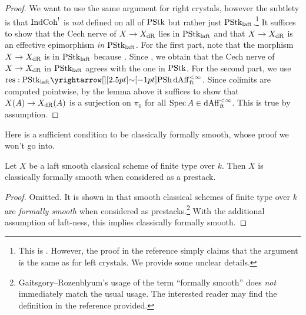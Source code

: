 \documentclass[./main.tex]{subfiles}
\begin{document}
\begin{proof}
  We want to use the same argument for right crystals,
  however the subtlety is that $\mathrm{IndCoh}^!$ is 
  \emph{not} defined on all of $\mathrm{PStk}$ but rather just $\mathrm{PStk}_{\mathrm{laft}}$.\footnote{
    This is \cite[Lem 2.3.11]{Crys}. However, 
    the proof in the reference simply claims that the argument is
    the same as for left crystals.
    We provide some unclear details.
  }
  It suffices to show that the Cech nerve of $X \to X_{\mathrm{dR}}$ lies in $\mathrm{PStk}_{\mathrm{laft}}$
  and that $X \to X_{\mathrm{dR}}$ is an effective epimorphism \emph{in $\mathrm{PStk}_{\mathrm{laft}}$}.
  For the first part,
  note that the morphism $X \to X_{\mathrm{dR}}$ is in $\mathrm{PStk}_{\mathrm{laft}}$ because 
  .
  Since ,
  we obtain that the Cech nerve of $X \to X_{\mathrm{dR}}$ in $\mathrm{PStk}_{\mathrm{laft}}$
  agrees with the one in $\mathrm{PStk}$.
  For the second part, we use 
  {$\mathrm{res} : \PSTK_\LAFT \map{\sim}{} \PSH\,\DAFF^{<\infty}_\FT$}.
  Since colimits are computed pointwise, by the lemma above
  it suffices to show that $X(A) \to X_{\mathrm{dR}}(A)$ is a surjection on $\pi_0$
  for all $\mathrm{Spec}\,A \in \mathrm{dAff}^{< \infty}_{\mathrm{ft}}$.
  This is true by assumption.

\end{proof}

Here is a sufficient condition to be classically formally smooth,
whose proof we won't go into.

\begin{prop}
  
  Let $X$ be a laft smooth classical scheme of finite type over $k$.
  Then $X$ is classically formally smooth when considered as a prestack.
\end{prop}
\begin{proof}
  Omitted.
  It is shown in \cite[Prop 8.4.2]{DGINDSCH} that 
  smooth classical schemes of finite type over $k$
  are \emph{formally smooth} when considered as prestacks.\footnote{
  Gaitsgory--Rozenblyum's usage of the term ``formally smooth'' does \emph{not}
  immediately match the usual usage.
  The interested reader may find the definition in the reference provided.
}
With the additional assumption of laft-ness,
this implies classically formally smooth.
\end{proof}
\end{document}
